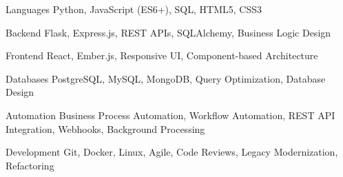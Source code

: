 
\begin{cvskills}

\cvskill
{Languages}
{Python, JavaScript (ES6+), SQL, HTML5, CSS3}

\cvskill
{Backend}
{Flask, Express.js, REST APIs, SQLAlchemy, Business Logic Design}

\cvskill
{Frontend}
{React, Ember.js, Responsive UI, Component-based Architecture}

\cvskill
{Databases}
{PostgreSQL, MySQL, MongoDB, Query Optimization, Database Design}

\cvskill
{Automation}
{Business Process Automation, Workflow Automation, REST API Integration, Webhooks, Background Processing}

\cvskill
{Development}
{Git, Docker, Linux, Agile, Code Reviews, Legacy Modernization, Refactoring}

\end{cvskills}